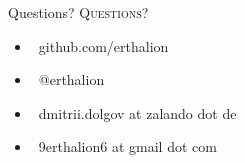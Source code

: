 \documentclass[usenames,dvipsnames, 18pt, compress, aspectratio=169]{beamer}
\def\twitter{{\FA \faTwitter}}
\def\github{{\FA \faGithub}}
\def\email{{\FA \faEnvelope}}
\begin{document}
\fontsize{17pt}{18}\selectfont
\begin{frame}
  \vspace*{2.5cm}
  \begin{minipage}[b][\paperheight]{\textwidth}
  \begin{center}

      \linespread{1.0}%
      \if@noSmallCapitals%
        Questions?
      \else%
        \scshape{\color{black} Questions?}%
      \fi%
      \vspace*{0.3em}

      \fontsize{13pt}{14}\selectfont
        \begin{itemize}[label={}]
            \item {\color{black} \github\ github.com/erthalion}
            \item {\color{black} \twitter\ @erthalion}
            \item {\color{black}\email\ dmitrii.dolgov at zalando dot de}
            \item {\color{black}\email\ 9erthalion6 at gmail dot com}
        \end{itemize}
      \vspace*{2.5em}%

    \vfill
    \vspace*{2em}
  \end{center}
  \end{minipage}

\end{frame}
\end{document}
